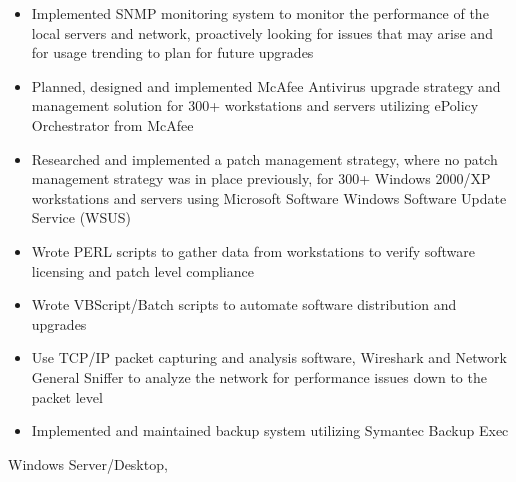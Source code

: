\begin{experiences}
{\begin{itemize}
                        \item Implemented SNMP monitoring system to monitor the performance of the local servers and network, proactively looking for issues that may arise and for usage trending to plan for future upgrades
                        \item Planned, designed and implemented McAfee Antivirus upgrade strategy and management solution for 300+ workstations and servers utilizing ePolicy Orchestrator from McAfee
                        \item Researched and implemented a patch management strategy, where no patch management strategy was in place previously, for 300+ Windows 2000/XP workstations and servers using Microsoft Software Windows Software Update Service (WSUS)
                        \item Wrote PERL scripts to gather data from workstations to verify software licensing and patch level compliance
                        \item Wrote VBScript/Batch scripts to automate software distribution and upgrades
                        \item Use TCP/IP packet capturing and analysis software, Wireshark and Network General Sniffer to analyze the network for performance issues down to the packet level
                        \item Implemented and maintained backup system utilizing Symantec Backup Exec
                      \end{itemize}
                    }
                    {Windows Server/Desktop,}
\end{experiences}
